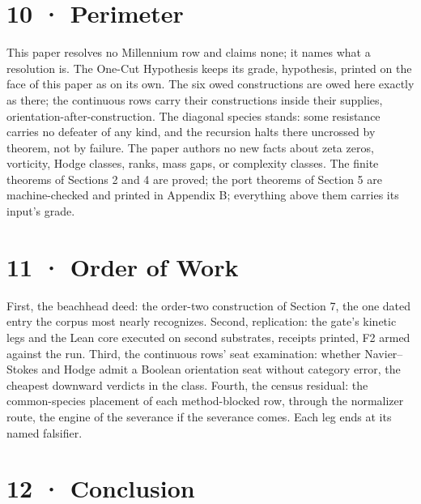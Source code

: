 \documentclass[10pt,twocolumn]{article}
\begin{document}
\section{10 · Perimeter}\label{perimeter-1}

This paper resolves no Millennium row and claims none; it names what a
resolution is. The One-Cut Hypothesis keeps its grade, hypothesis,
printed on the face of this paper as on its own. The six owed
constructions are owed here exactly as there; the continuous rows carry
their constructions inside their supplies,
orientation-after-construction. The diagonal species stands: some
resistance carries no defeater of any kind, and the recursion halts
there uncrossed by theorem, not by failure. The paper authors no new
facts about zeta zeros, vorticity, Hodge classes, ranks, mass gaps, or
complexity classes. The finite theorems of Sections 2 and 4 are proved;
the port theorems of Section 5 are machine-checked and printed in
Appendix B; everything above them carries its input's grade.

\section{11 · Order of Work}\label{order-of-work-1}

First, the beachhead deed: the order-two construction of Section 7, the
one dated entry the corpus most nearly recognizes. Second, replication:
the gate's kinetic legs and the Lean core executed on second substrates,
receipts printed, F2 armed against the run. Third, the continuous rows'
seat examination: whether Navier--Stokes and Hodge admit a Boolean
orientation seat without category error, the cheapest downward verdicts
in the class. Fourth, the census residual: the common-species placement
of each method-blocked row, through the normalizer route, the engine of
the severance if the severance comes. Each leg ends at its named
falsifier.

\section{12 · Conclusion}\label{conclusion}
\end{document}
